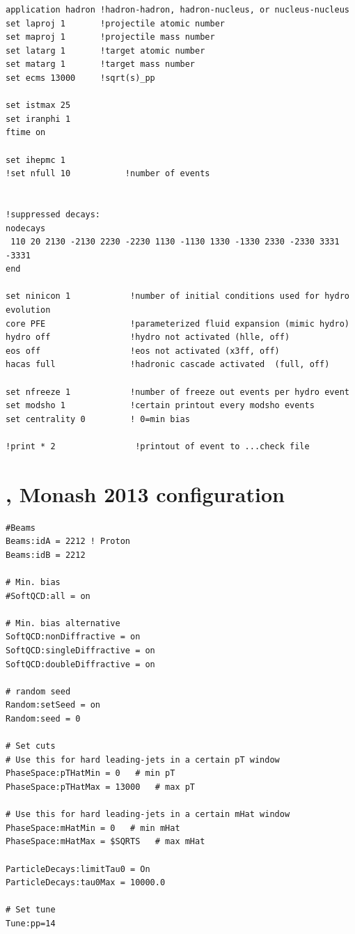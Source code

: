 \begin{verbatim}
application hadron !hadron-hadron, hadron-nucleus, or nucleus-nucleus
set laproj 1       !projectile atomic number
set maproj 1       !projectile mass number
set latarg 1       !target atomic number
set matarg 1       !target mass number
set ecms 13000     !sqrt(s)_pp

set istmax 25
set iranphi 1
ftime on

set ihepmc 1
!set nfull 10           !number of events


!suppressed decays:
nodecays
 110 20 2130 -2130 2230 -2230 1130 -1130 1330 -1330 2330 -2330 3331 -3331
end

set ninicon 1            !number of initial conditions used for hydro evolution
core PFE                 !parameterized fluid expansion (mimic hydro)
hydro off                !hydro not activated (hlle, off)
eos off                  !eos not activated (x3ff, off)
hacas full               !hadronic cascade activated  (full, off)

set nfreeze 1            !number of freeze out events per hydro event
set modsho 1             !certain printout every modsho events
set centrality 0         ! 0=min bias

!print * 2                !printout of event to ...check file

\end{verbatim}

\section{\Pythiaeight, Monash 2013 configuration}
\label{sec:AppPythia8}

\begin{verbatim}
#Beams
Beams:idA = 2212 ! Proton
Beams:idB = 2212

# Min. bias
#SoftQCD:all = on

# Min. bias alternative
SoftQCD:nonDiffractive = on
SoftQCD:singleDiffractive = on
SoftQCD:doubleDiffractive = on

# random seed
Random:setSeed = on
Random:seed = 0

# Set cuts
# Use this for hard leading-jets in a certain pT window
PhaseSpace:pTHatMin = 0   # min pT
PhaseSpace:pTHatMax = 13000   # max pT

# Use this for hard leading-jets in a certain mHat window
PhaseSpace:mHatMin = 0   # min mHat
PhaseSpace:mHatMax = $SQRTS   # max mHat

ParticleDecays:limitTau0 = On
ParticleDecays:tau0Max = 10000.0

# Set tune
Tune:pp=14
\end{verbatim}

